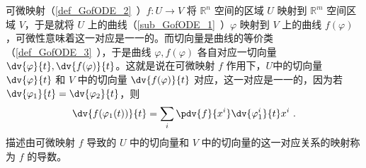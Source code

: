 
可微映射（\autoref{def_GofODE_2}~）$f:U\rightarrow V$ 将 $\mathbb R^n$ 空间的区域 $U$ 映射到 $\mathbb R^m$ 空间区域 $V$，于是就将 $U$ 上的曲线（\autoref{sub_GofODE_1}~）$\varphi$ 映射到 $V$ 上的曲线 $f(\varphi)$，可微性意味着这一对应是一一的。而切向量是曲线的等价类（\autoref{def_GofODE_3}~），于是曲线 $\varphi,f(\varphi)$ 各自对应一切向量 $\dv{\varphi}{t},\dv{f(\varphi)}{t}$。这就是说在可微映射 $f$ 作用下，$U$中的切向量 $\dv{\varphi}{t}$ 和 $V$ 中的切向量 $\dv{f(\varphi)}{t}$ 对应，这一对应是一一的，因为若 $\dv{\varphi_1}{t}=\dv{\varphi_2}{t}$，则
\begin{equation}
\dv{f(\varphi_1(t))}{t}=\sum_i\pdv{f}{x^i}\dv{\varphi^i_1}{t}x^i~.
\end{equation}
描述由可微映射 $f$ 导致的 $U$ 中的切向量和 $V$ 中的切向量的这一对应关系的映射称为 $f$ 的导数。

